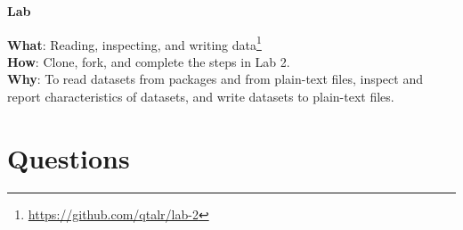 \documentclass[
  letterpaper,
]{latex/krantz}
\DeclareRobustCommand{\href}[2]{#2\footnote{\url{#1}}}
\begin{document}
\begin{tcolorbox}[enhanced jigsaw, left=2mm, arc=.35mm, colback=white, rightrule=.15mm, toprule=.15mm, breakable, leftrule=.75mm, opacityback=0, bottomrule=.15mm]

\textbf{ Lab}

\textbf{What}: \href{https://github.com/qtalr/lab-2}{Reading,
inspecting, and writing data}\\
\textbf{How}: Clone, fork, and complete the steps in Lab 2.\\
\textbf{Why}: To read datasets from packages and from plain-text files,
inspect and report characteristics of datasets, and write datasets to
plain-text files.

\end{tcolorbox}

\hypertarget{questions-2}{%
\section*{Questions}\label{questions-2}}

\end{document}
